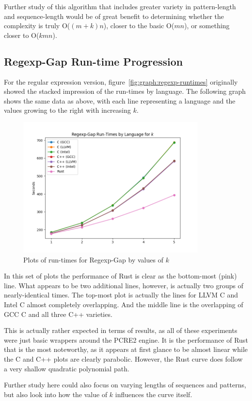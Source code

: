 Further study of this algorithm that includes greater variety in pattern-length and sequence-length would be of great benefit to determining whether the complexity is truly O($(m+k)n$), closer to the basic O($mn$), or something closer to O($kmn$).

\subsection{Regexp-Gap Run-time Progression}
\label{subsec:regexp-gap-runtimes}

For the regular expression version, figure~\ref{fig:graph:regexp-runtimes} originally showed the stacked impression of the run-times by language. The following graph shows the same data as above, with each line representing a language and the values growing to the right with increasing $k$.

\begin{figure}[h]
	\centering
	\includegraphics[width=0.85\textwidth]{figures/k_runtimes-regexp.png}
	\caption{Plots of run-times for Regexp-Gap by values of $k$}
	\label{fig:graph:k_runtimes-regexp}
\end{figure}

In this set of plots the performance of Rust is clear as the bottom-most (pink) line. What appears to be two additional lines, however, is actually two groups of nearly-identical times. The top-most plot is actually the lines for LLVM C and Intel C almost completely overlapping. And the middle line is the overlapping of GCC C and all three C++ varieties.

This is actually rather expected in terms of results, as all of these experiments were just basic wrappers around the PCRE2 engine. It is the performance of Rust that is the most noteworthy, as it appears at first glance to be almost linear while the C and C++ plots are clearly parabolic. However, the Rust curve does follow a very shallow quadratic polynomial path.

Further study here could also focus on varying lengths of sequences and patterns, but also look into how the value of $k$ influences the curve itself.
